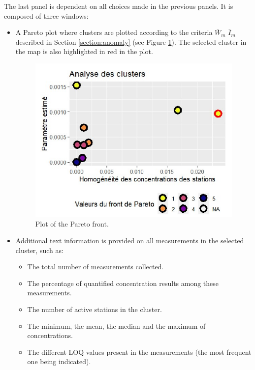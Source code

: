 The last panel is dependent on all choices made in the previous panels. It is composed of three windows:   
\begin{itemize}
\item A Pareto plot where clusters are plotted according to the criteria $\bar{W}_m$ $\bar{I}_m$ described in Section \ref{section:anomaly} (see Figure \ref{fig:Imapp8}). The selected cluster in the map is also highlighted in red in the plot.
\begin{figure}[htbp]
 \centering
 \includegraphics[]{figs/Chap6/Im_appbis8.pdf}
 \caption{Plot of the Pareto front.}
 \label{fig:Imapp8}
\end{figure}
\item Additional text information is provided on all measurements in the selected cluster, such as: %
\begin{itemize}
\item The total number of measurements collected.
\item The percentage of quantified concentration results among these measurements.
\item The number of active stations in the cluster.
\item The minimum, the mean, the median and the maximum of concentrations.
\item The different LOQ values present in the measurements (the most frequent one being indicated).

\end{itemize}
\end{itemize}
